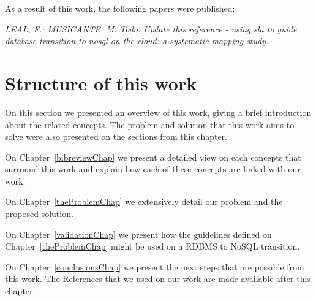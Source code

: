 As a result of this work, the following papers were published:

\textit{LEAL, F.; MUSICANTE, M. Todo: Update this reference - using sla to guide database transition to nosql on the cloud: a systematic mapping study.}


\section{Structure of this work}
On this section we presented an overview of this work, giving a brief introduction about the related concepts. The problem and solution that this work aims to solve were also presented on the sections from this chapter. 

On Chapter~\ref{bibreviewChap} we present a detailed view on each concepts that surround this work and explain how each of these concepts are linked with our work. 

On Chapter~\ref{theProblemChap} we extensively detail our problem and the proposed solution.

On Chapter~\ref{validationChap} we present how the guidelines defined on Chapter~\ref{theProblemChap} might be used on a RDBMS to NoSQL transition. 

On Chapter~\ref{conclusionsChap} we present the next steps that are possible from this work. The References that we used on our work are made available after this chapter.  